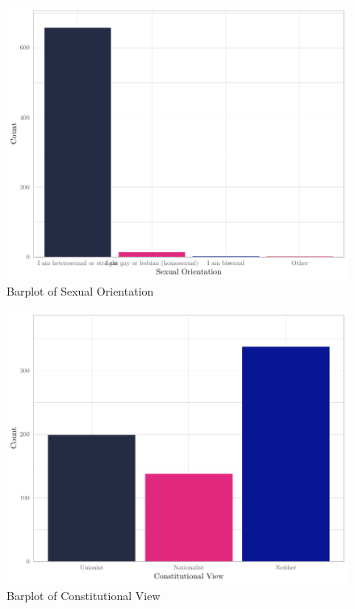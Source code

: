 \documentclass[
]{article}
\begin{document}
\begin{figure}[H]

{\centering \includegraphics[width=0.8\linewidth]{paper_files/figure-latex/unnamed-chunk-7-1} 

}

\caption{Barplot of Sexual Orientation}\label{fig:unnamed-chunk-7}
\end{figure}

\begin{figure}[H]

{\centering \includegraphics[width=0.8\linewidth]{paper_files/figure-latex/unnamed-chunk-8-1} 

}

\caption{Barplot of Constitutional View}\label{fig:unnamed-chunk-8}
\end{figure}
\end{document}
